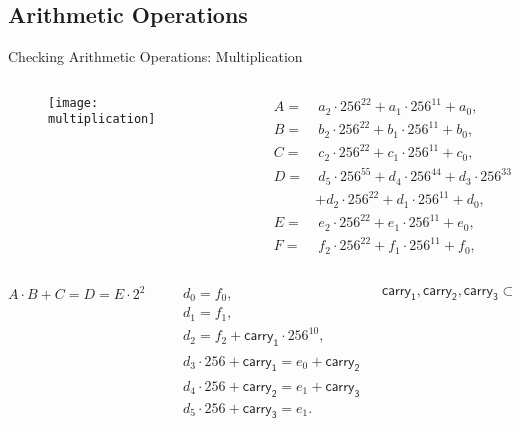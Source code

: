 \subsection{Arithmetic Operations}

\begin{frame}{Checking Arithmetic Operations: Multiplication}
\scriptsize
\begin{columns}
\begin{column}{0.5\textwidth}
\begin{figure}
	\texttt{[image: multiplication]}
\end{figure}
\end{column}
\begin{column}{0.5\textwidth}
\begin{align*}
A = &~a_2 \cdot 256^{22} + a_1 \cdot 256^{11} + a_0, \\
B = &~b_2 \cdot 256^{22} + b_1 \cdot 256^{11} + b_0, \\
C = &~c_2 \cdot 256^{22} + c_1 \cdot 256^{11} + c_0, \\
D = &~d_5 \cdot 256^{55} + d_4 \cdot 256^{44} + d_3 \cdot 256^{33} \\
&+ d_2 \cdot 256^{22} + d_1 \cdot 256^{11} + d_0, \\
E = &~e_2 \cdot 256^{22} + e_1 \cdot 256^{11} + e_0, \\
F = &~f_2 \cdot 256^{22} + f_1 \cdot 256^{11} + f_0,
\end{align*}
\end{column}
\end{columns}
\begin{columns}
\begin{column}{0.33\textwidth}
\[
A \cdot B + C = D = E \cdot 2^{256} + F
\]
\end{column}
\begin{column}{0.33\textwidth}
\begin{align*}
&d_0 = f_0, \\
&d_1 = f_1, \\
&d_2 = f_2 + \mathsf{carry_1} \cdot 256^{10}, \\
&d_3 \cdot 256 + \mathsf{carry_1} = e_0 + \mathsf{carry_2} \cdot 256^{11}, \\
&d_4 \cdot 256 + \mathsf{carry_2} = e_1 + \mathsf{carry_3} \cdot 256^{11}, \\
&d_5 \cdot 256 + \mathsf{carry_3} = e_1.
\end{align*}
\end{column}
\begin{column}{0.33\textwidth}
\[
\mathsf{carry_1}, \mathsf{carry_2}, \mathsf{carry_3} \subset \mathsf{byte}.
\]
\end{column}
\end{columns}
\end{frame}









